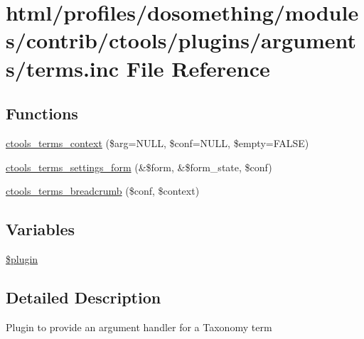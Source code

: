 \hypertarget{arguments_2terms_8inc}{
\section{html/profiles/dosomething/modules/contrib/ctools/plugins/arguments/terms.inc File Reference}
\label{arguments_2terms_8inc}
}
\subsection*{Functions}
\begin{DoxyCompactItemize}
\item 
\hyperlink{arguments_2terms_8inc_adbd3f90249294bc22390c17da70d3944}{ctools\_\-terms\_\-context} (\$arg=NULL, \$conf=NULL, \$empty=FALSE)
\item 
\hyperlink{arguments_2terms_8inc_a351acc9b20f57b14827cb63e3eb73088}{ctools\_\-terms\_\-settings\_\-form} (\&\$form, \&\$form\_\-state, \$conf)
\item 
\hyperlink{arguments_2terms_8inc_ad3e0d214b216c57818de2686f549eeaa}{ctools\_\-terms\_\-breadcrumb} (\$conf, \$context)
\end{DoxyCompactItemize}
\subsection*{Variables}
\begin{DoxyCompactItemize}
\item 
\hyperlink{arguments_2terms_8inc_ada8a7130088351710bb02ed622d6bf65}{\$plugin}
\end{DoxyCompactItemize}


\subsection{Detailed Description}
Plugin to provide an argument handler for a Taxonomy term 

